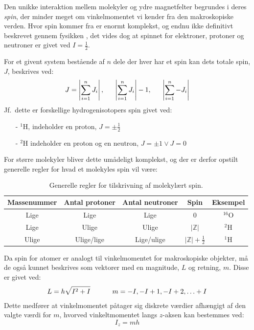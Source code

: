     Den unikke interaktion mellem molekyler og ydre magnetfelter begrundes i deres \textit{spin}, der minder meget om vinkelmomentet vi kender fra den makroskopiske verden. Hvor spin kommer fra er enormt komplekst, og endnu ikke definitivt beskrevet gennem fysikken \parencite{Edwi2015}, det vides dog at spinnet for elektroner, protoner og neutroner er givet ved $I=\frac{1}{2}$.

    For et givent system bestående af $n$ dele der hver har et spin kan dets totale spin, $J$, beskrives ved:
    \[
        J=\left|\sum_{i=1}^n J_i\right|, \hskip 16pt \left|\sum_{i=1}^n J_i\right|-1, \hskip 16pt \left|\sum_{i=1}^n -J_i\right|
    \]
    Jf.\ dette er forskellige hydrogenisotopers spin givet ved:
    \begin{itemize}
        \item[-] $^1$H, indeholder en proton, $J=\pm\frac{1}{2}$ 
        \item[-] $^2$H indeholder en proton og en neutron, $J=\pm 1 \vee J=0$ 
    \end{itemize}
    For større molekyler bliver dette umådeligt komplekst, og der er derfor opstilt generelle regler for hvad et molekyles spin vil være:
    \begin{table}[H]\centering
        \caption{Generelle regler for tilskrivning af molekylært spin.}
        \begin{tabular}{*{5}{c}}
            \toprule
            Massenummer & Antal protoner & Antal neutroner & Spin & Eksempel \\
            \midrule
            Lige & Lige & Lige & $0$ & $^{16}$O \\
            Lige & Ulige & Ulige & $\left|\mathbb{Z}\right|$ & $^2$H \\
            Ulige & Ulige/lige & Lige/ulige &  $\left|\mathbb{Z}\right|+\frac{1}{2}$ & $^1$H \\
            \bottomrule
        \end{tabular}
    \end{table}
    Da spin for atomer er analogt til vinkelmomentet for makroskopiske objekter, må de også kunnet beskrives som vektorer med en magnitude, $L$ og retning, $m$. Disse er givet ved:
    \[
        L=h\sqrt{I^2+I} \hskip 32pt m=-I,-I+1,-I+2,\ldots+I
    \]
    Dette medfører at vinkelmomentet påtager sig diskrete værdier afhængigt af den valgte værdi for $m$, hvorved vinkeltmomentet langs $z$-aksen kan bestemmes ved:
    \[
        I_z=mh
    \]
